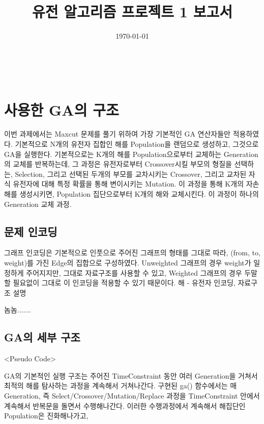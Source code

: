 \documentclass{article}
\begin{document}
\title{ 유전 알고리즘 프로젝트 1 보고서 }
\author{ }
\date{\today}
\maketitle


{~~}


\section{ 사용한 GA의 구조 }

이번 과제에서는 Maxcut 문제를 풀기 위하여 가장 기본적인 GA 연산자들만 적용하였다.
기본적으로 N개의 유전자 집합인 해를 Population을 랜덤으로 생성하고, 그것으로 GA을 실행한다.
기본적으로는 K개의 해를 Population으로부터 교체하는 Generation의 교체를 반복하는데, 그 과정은 유전자로부터 Crossover시킬 부모의 형질을 선택하는, Selection, 그리고 선택된 두개의 부모를 교차시키는 Crossover, 그리고 교차된 자식 유전자에 대해 특정 확률을 통해 변이시키는 Mutation. 이 과정을 통해 K개의 자손 해를 생성시키면, Population 집단으로부터 K개의 해와 교체시킨다. 이 과정이 하나의 Generation 교체 과정.


\subsection{ 문제 인코딩 }

그래프 인코딩은 기본적으로 인풋으로 주어진 그래프의 형태를 그대로 따라, (from, to, weight)를 가진 Edge의 집합으로 구성하였다. Unweighted 그래프의 경우 weight가 일정하게 주어지지만, 그대로 자료구조를 사용할 수 있고, Weighted 그래프의 경우 두말 할 필요없이 그대로 이 인코딩을 적용할 수 있기 때문이다.
해 - 유전자 인코딩, 
자료구조 설명

놈놈.......


\subsection{ GA의 세부 구조 }

<Pseudo Code>

GA의 기본적인 실행 구조는 주어진 TimeConstraint 동안 여러 Generation을 거쳐서 최적의 해를 탐사하는 과정을 계속해서 거쳐나간다. 구현된 ga() 함수에서는 매 Generation, 즉 Select/Crossover/Mutation/Replace 과정을 TimeConstraint 안에서 계속해서 반복문을 돌면서 수행해나간다. 이러한 수행과정에서 계속해서 해집단인 Population은 진화해나가고, 
\end{document}
